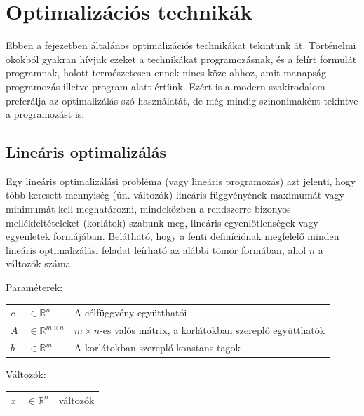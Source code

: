 
\chapter{Optimalizációs technikák}\label{chap:optimalization}
Ebben a fejezetben általános optimalizációs technikákat tekintünk át. Történelmi okokból gyakran hívjuk ezeket a technikákat programozásnak, és a felírt formulát programnak, holott természetesen ennek nincs köze ahhoz, amit manapság programozás illetve program alatt értünk. Ezért is a modern szakirodalom preferálja az optimalizálás szó használatát, de még mindig szinonimaként tekintve a programozást is.

\section{Lineáris optimalizálás}

Egy lineáris optimalizálási probléma (vagy lineáris programozás) azt jelenti, hogy több keresett mennyiség (ún. változók) lineáris függvényének maximumát vagy minimumát kell meghatározni, mindeközben a rendszerre bizonyos mellékfeltételeket (korlátok) szabunk meg, lineáris egyenlőtlenségek vagy egyenletek formájában.
Belátható, hogy a fenti definíciónak megfelelő minden lineáris optimalizálási feladat leírható az alábbi tömör formában, ahol $n$ a változók száma.

Paraméterek:

\begin{tabular}{lll}
	$c$ & $\in \mathbb{R}^n$   & A célfüggvény együtthatói \\
	$A$ & $\in \mathbb{R}^{m×n}$  & $m × n$-es valós mátrix, a korlátokban szereplő együtthatók \\
	$b$ & $\in \mathbb{R}^m$   & A korlátokban szereplő konstans tagok \\
\end{tabular}

Változók:

\begin{tabular}{lll}
	$x$ & $\in \mathbb{R}^n$ & változók \\
\end{tabular}

